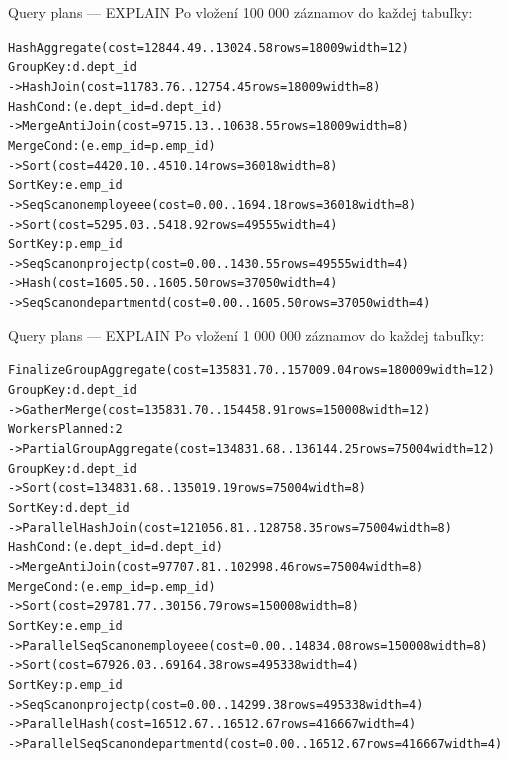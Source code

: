 \documentclass[12pt]{beamer}
\begin{document}
\begin{frame}[fragile]{Query plans --- EXPLAIN}
Po vložení 100 000 záznamov do každej tabuľky:
\scriptsize
\begin{alltt}
HashAggregate  (cost=12844.49..13024.58 rows=18009 width=12)
  Group Key: d.dept_id
  ->  Hash Join  (cost=11783.76..12754.45 rows=18009 width=8)
        Hash Cond: (e.dept_id = d.dept_id)
        ->  Merge Anti Join  (cost=9715.13..10638.55 rows=18009 width=8)
              Merge Cond: (e.emp_id = p.emp_id)
              ->  Sort  (cost=4420.10..4510.14 rows=36018 width=8)
                    Sort Key: e.emp_id
                    ->  Seq Scan on employee e  (cost=0.00..1694.18 rows=36018 width=8)
              ->  Sort  (cost=5295.03..5418.92 rows=49555 width=4)
                    Sort Key: p.emp_id
                    ->  Seq Scan on project p  (cost=0.00..1430.55 rows=49555 width=4)
        ->  Hash  (cost=1605.50..1605.50 rows=37050 width=4)
              ->  Seq Scan on department d  (cost=0.00..1605.50 rows=37050 width=4)
\end{alltt}
\end{frame}

\begin{frame}[fragile]{Query plans --- EXPLAIN}
Po vložení 1 000 000 záznamov do každej tabuľky:
\tiny
\begin{alltt}
Finalize GroupAggregate  (cost=135831.70..157009.04 rows=180009 width=12)
  Group Key: d.dept_id
  ->  Gather Merge  (cost=135831.70..154458.91 rows=150008 width=12)
        Workers Planned: 2
        ->  Partial GroupAggregate  (cost=134831.68..136144.25 rows=75004 width=12)
              Group Key: d.dept_id
              ->  Sort  (cost=134831.68..135019.19 rows=75004 width=8)
                    Sort Key: d.dept_id
                    ->  Parallel Hash Join  (cost=121056.81..128758.35 rows=75004 width=8)
                          Hash Cond: (e.dept_id = d.dept_id)
                          ->  Merge Anti Join  (cost=97707.81..102998.46 rows=75004 width=8)
                                Merge Cond: (e.emp_id = p.emp_id)
                                ->  Sort  (cost=29781.77..30156.79 rows=150008 width=8)
                                      Sort Key: e.emp_id
                                      ->  Parallel Seq Scan on employee e  (cost=0.00..14834.08 rows=150008 width=8)
                                ->  Sort  (cost=67926.03..69164.38 rows=495338 width=4)
                                      Sort Key: p.emp_id
                                      ->  Seq Scan on project p  (cost=0.00..14299.38 rows=495338 width=4)
                          ->  Parallel Hash  (cost=16512.67..16512.67 rows=416667 width=4)
                                ->  Parallel Seq Scan on department d  (cost=0.00..16512.67 rows=416667 width=4)
\end{alltt}
\end{frame}
\end{document}
